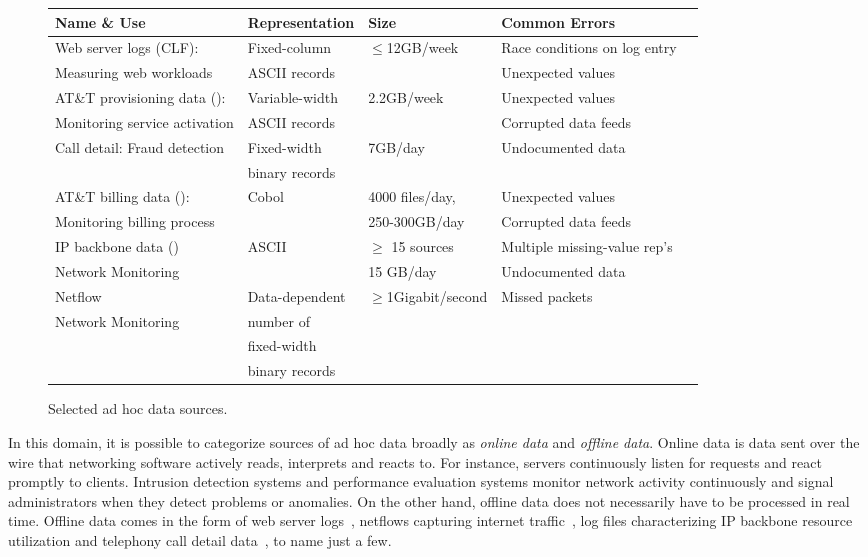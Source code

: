 \documentclass[11pt]{article}
\begin{document}
\begin{figure*}
\begin{center}
\begin{tabular}{@{}|l|l|l|l|l|}
\hline
Name \& Use                           & Representation    & Size           & Common Errors \\ \hline\hline
Web server logs (CLF):                & Fixed-column      & $\leq$12GB/week & Race conditions on log entry\\ 
Measuring web workloads               & ASCII records     &                             & Unexpected values\\ \hline
AT\&T provisioning data (\dibbler{}): & Variable-width    & 2.2GB/week & Unexpected values \\ 
Monitoring service activation         & ASCII records     &            & Corrupted data feeds \\ \hline
Call detail: Fraud detection          & Fixed-width       &\appr{}7GB/day &  Undocumented data\\
                                      & binary records  & & \\ \hline 
AT\&T billing data (\ningaui{}):      & Cobol  & \appr{}4000 files/day, & Unexpected values\\ 
Monitoring billing process   &                             & 250-300GB/day    & Corrupted data feeds \\ \hline
IP backbone data (\darkstar{})  & ASCII  & $\ge$ 15 sources  & Multiple missing-value rep's \\
Network Monitoring  &        & \appr{}15 GB/day              & Undocumented data \\ \hline
Netflow                               & Data-dependent      & $\ge$1Gigabit/second  & Missed packets\\ 
Network Monitoring        & number of   &                       & \\
                                      & fixed-width && \\
                                      & binary records && \\ \hline

\end{tabular}
\caption{Selected ad hoc data sources.}
\label{figure:data-sources}
\end{center}
\end{figure*}


In this domain, it is possible to categorize sources of ad hoc data broadly
as {\em online data} and {\em offline data}.  Online data
is data sent over the wire that networking software actively
reads, interprets and reacts to.  For instance, servers continuously
listen for requests and react promptly to clients.  Intrusion detection 
systems and performance evaluation systems
monitor network activity continuously and signal administrators
when they detect problems or anomalies.  On the other hand, offline data
does not necessarily have to be processed in real time.  Offline
data comes in the form of web server
logs~\cite{wpp}, netflows capturing internet traffic~\cite{netflow},
log files characterizing IP backbone resource utilization and telephony
call detail data~\cite{hancock-toplas}, to name just a few.
\end{document}

